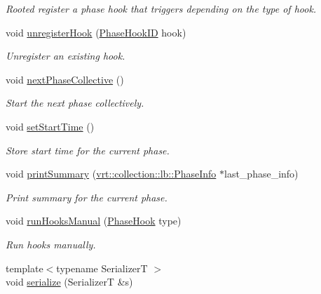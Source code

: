 \begin{DoxyCompactItemize}
\begin{DoxyCompactList}\small\item\em Rooted register a phase hook that triggers depending on the type of hook. \end{DoxyCompactList}\item 
void \hyperlink{structvt_1_1phase_1_1_phase_manager_a78334fd49c35f694f1e5fe5c560dc211}{unregister\+Hook} (\hyperlink{structvt_1_1phase_1_1_phase_hook_i_d}{Phase\+Hook\+ID} hook)
\begin{DoxyCompactList}\small\item\em Unregister an existing hook. \end{DoxyCompactList}\item 
void \hyperlink{structvt_1_1phase_1_1_phase_manager_ac94bfde4a103cbdec426542191c41092}{next\+Phase\+Collective} ()
\begin{DoxyCompactList}\small\item\em Start the next phase collectively. \end{DoxyCompactList}\item 
void \hyperlink{structvt_1_1phase_1_1_phase_manager_a7844c9468a45c9e49d94436f3f565a1f}{set\+Start\+Time} ()
\begin{DoxyCompactList}\small\item\em Store start time for the current phase. \end{DoxyCompactList}\item 
void \hyperlink{structvt_1_1phase_1_1_phase_manager_a789e81d0a1ae09f1aeac4e72fd884584}{print\+Summary} (\hyperlink{structvt_1_1vrt_1_1collection_1_1lb_1_1_phase_info}{vrt\+::collection\+::lb\+::\+Phase\+Info} $\ast$last\+\_\+phase\+\_\+info)
\begin{DoxyCompactList}\small\item\em Print summary for the current phase. \end{DoxyCompactList}\item 
void \hyperlink{structvt_1_1phase_1_1_phase_manager_ae436f95e5eb570b17c71a48d96675f69}{run\+Hooks\+Manual} (\hyperlink{namespacevt_1_1phase_aec9a63fdd99680d7a7fe99d321193811}{Phase\+Hook} type)
\begin{DoxyCompactList}\small\item\em Run hooks manually. \end{DoxyCompactList}\item 
{\footnotesize template$<$typename SerializerT $>$ }\\void \hyperlink{structvt_1_1phase_1_1_phase_manager_a9cc247a2194bc858fa043a5fe5c9fb76}{serialize} (SerializerT \&s)
\end{DoxyCompactItemize}
